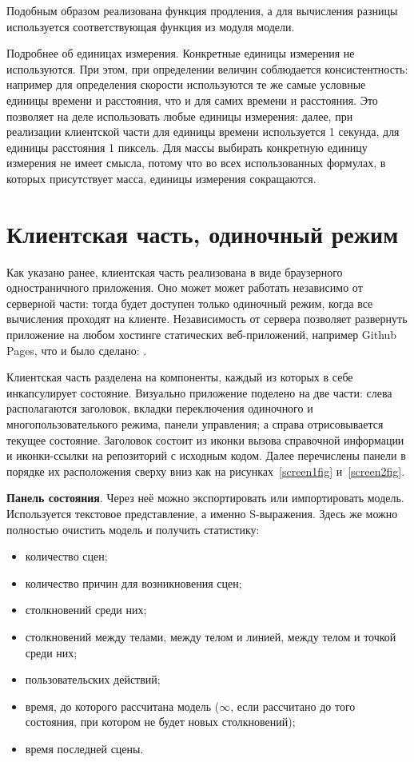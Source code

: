 Подобным образом реализована функция продления, а для вычисления разницы используется соответствующая функция из модуля модели.

Подробнее об единицах измерения. Конкретные единицы измерения не используются.
При этом, при определении величин соблюдается консистентность: например для определения скорости используются
те же самые условные единицы времени и расстояния, что и для самих времени и расстояния. Это позволяет на деле использовать
любые единицы измерения: далее, при реализации клиентской части для единицы времени используется 1 секунда,
для единицы расстояния 1 пиксель. Для массы выбирать конкретную единицу измерения не имеет смысла, потому что во всех
использованных формулах, в которых присутствует масса, единицы измерения сокращаются.

\section{Клиентская часть, одиночный режим}\label{clientimpl}

Как указано ранее, клиентская часть реализована в виде браузерного одностраничного приложения.
Оно может может работать независимо от серверной части: тогда будет доступен только одиночный режим,
когда все вычисления проходят на клиенте. Независимость от сервера позволяет развернуть приложение на
любом хостинге статических веб-приложений, например Github Pages, что и было сделано:
\underline{}.

Клиентская часть разделена на компоненты, каждый из которых в себе инкапсулирует состояние.
Визуально приложение поделено на две части: слева располагаются заголовок,
вкладки переключения одиночного и многопользователького режима, панели управления;
а справа отрисовывается текущее состояние.
Заголовок состоит из иконки вызова справочной информации
и иконки-ссылки на репозиторий с исходным кодом. Далее перечислены панели в порядке их
расположения сверху вниз как на рисунках~\ref{screen1fig} и~\ref{screen2fig}.

\textbf{Панель состояния}. Через неё можно экспортировать или импортировать модель.
Используется текстовое представление, а именно S-выражения. Здесь же можно полностью очистить модель и
получить статистику:

\begin{itemize}
    \item количество сцен;
    \item количество причин для возникновения сцен;
    \item столкновений среди них;
    \item столкновений между телами, между телом и линией, между телом и точкой среди них;
    \item пользовательских действий;
    \item время, до которого рассчитана модель (\(\infty\), если рассчитано до того состояния, при котором не будет новых столкновений);
    \item время последней сцены.
\end{itemize}

